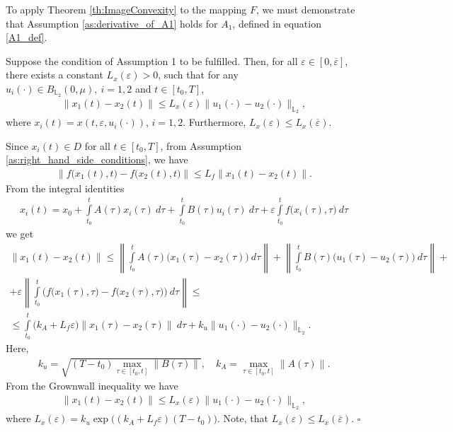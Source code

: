 \documentclass[../main.tex]{subfiles}
\begin{document}
To apply Theorem \ref{th:ImageConvexity} to the mapping $F$, we must demonstrate that Assumption \ref{as:derivative_of_A1} holds for $A_1$, defined in equation \eqref{A1_def}.
\begin{lemma}\label{lem:Lipx}
	Suppose the condition of Assumption 1 to be fulfilled. Then, for all $\varepsilon\in [0,\overline{\varepsilon}]$, there exists a constant $L_x(\varepsilon) > 0$, such that for any $u_i(\cdot) \in B_{\mathbb{L}_2}(0,\mu), \ i = 1,2$ and $t \in [t_0,T]$, 
	\begin{gather*}
		\| x_1(t) - x_2(t) \| \leqslant L_x(\varepsilon) \| u_1(\cdot) - u_2(\cdot) \|_{\mathbb{L}_2},
	\end{gather*}
	where $x_i(t) = x(t,\varepsilon,u_i(\cdot))$, $i = 1,2$. Furthermore, $L_x(\varepsilon) \leqslant L_x(\overline{\varepsilon})$. 
\end{lemma}
\doc 
Since $x_i(t) \in D$ for all $t\in [t_0,T]$, from Assumption \ref{as:right_hand_side_conditions}, we have
\begin{gather*}
	\|f\big(x_1(t),t\big) - f\big(x_2(t),t\big)\| \leqslant L_f\|x_1(t) -  x_2(t)\|.
\end{gather*}
From the integral identities
\begin{gather}\label{nonlinear_solution}
	x_i(t) = x_0 + \int\limits_{t_0}^t A(\tau)x_i(\tau)\ d\tau + \int\limits_{t_0}^t B(\tau)u_i(\tau)\ d\tau+
	\varepsilon\int\limits_{t_0}^t f\big(x_i(\tau),\tau\big)\ d\tau 
\end{gather}
we get
\begin{gather*}
	\| x_1(t) - x_2(t) \| \leqslant
	\left\| \int\limits_{t_0}^t A(\tau)\big(x_1(\tau) - x_2(\tau)\big)\ d\tau \right\| + 
	\left\|\int\limits_{t_0}^t B(\tau) \big(u_1(\tau) - u_2(\tau)\big)\ d\tau   \right\| + \\ +
	\varepsilon \left\| \int\limits_{t_0}^t \Big( f\big(x_1(\tau),\tau\big) - f\big(x_2(\tau),\tau\big) \Big)\ d\tau   \right\|  
	\leqslant \\ \leqslant
	\int\limits_{t_0}^t \big(k_A + L_f \varepsilon) \left\| x_1(\tau) - x_2(\tau)\right\| \ d\tau + k_u \| u_1(\cdot) - u_2(\cdot) \|_{\mathbb{L}_2}.
\end{gather*}
Here, 
\begin{gather*}
	k_u = \sqrt{(T-t_0) \max\limits_{\tau \in [{t_0},t]}\|B(\tau)\|}, \quad k_A =\max\limits_{\tau \in [{t_0},t]} \| A(\tau)\|.
\end{gather*}
From the Grownwall inequality we have 
\begin{gather*}
	\| x_1(t) - x_2(t) \| \leqslant L_x(\varepsilon) \| u_1(\cdot) - u_2(\cdot) \|_{\mathbb{L}_2},
\end{gather*}
where $L_x(\varepsilon) = k_u \exp\big((k_A + L_f \varepsilon)(T - t_0)\big) $. Note, that $L_x(\varepsilon) \leqslant L_x(\overline{\varepsilon})$. 
\hfill$\square$\\[1ex]%
\end{document}
